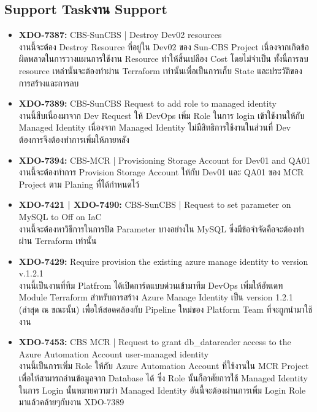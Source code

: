\subsection{\ifenglish Support Task\else งาน Support\fi}
\begin{itemize}
      \item \textbf{XDO-7387:} CBS-SunCBS | Destroy Dev02 resources \\
            งานนี้จะต้อง Destroy Resource ที่อยู่ใน Dev02 ของ Sun-CBS Project เนื่องจากเกิดข้อผิดพลาดในการวางแผนการใช้งาน Resource ทำให้สิ้นเปลือง Cost โดยไม่จำเป็น ทั้งนี้การลบ resource เหล่านั้นจะต้องทำผ่าน Terraform เท่านั้นเพื่อเป็นการเก็บ State และประวัติของการสร้างและการลบ
      \item \textbf{XDO-7389:} CBS-SunCBS Request to add role to managed identity \\
            งานนี้สืบเนื่องมาจาก Dev Request ให้ DevOps เพิ่ม Role ในการ login เข้าใช้งานให้กับ Managed Identity เนื่องจาก Managed Identity ไม่มีสิทธิการใช้งานในส่วนที่ Dev ต้องการจึงต้องทำการเพิ่มให้ภายหลัง
      \item \textbf{XDO-7394:} CBS-MCR | Provisioning Storage Account for Dev01 and QA01 \\
            งานนี้จะต้องทำการ Provision Storage Account ให้กับ Dev01 และ QA01 ของ MCR Project ตาม Planing ที่ได้กำหนดไว้
      \item \textbf{XDO-7421 | XDO-7490:} CBS-SunCBS | Request to set parameter on MySQL to Off on IaC\\
            งานนี้จะต้องหาวิธีการในการปิด Parameter บางอย่างใน MySQL ซึ่งมีข้อจำจัดคือจะต้องทำผ่าน Terraform เท่านั้น
      \item \textbf{XDO-7429:} Require provision the existing azure manage identity to version v.1.2.1\\
            งานนี้เป็นงานที่ทีม Platfrom ได้เปิดการ์ดแบบด่วนเข้ามาทีม DevOps เพิ่มให้อัพเดท Module Terraform สำหรับการสร้าง Azure Manage Identity เป็น version 1.2.1 (ล่าสุด ณ ขณะนั้น) เพื่อให้สอดคล้องกับ Pipeline ใหม่ของ Platform Team ที่จะถูกนำมาใช้งาน
      \item \textbf{XDO-7453:} CBS MCR | Request to grant db\_datareader access to the Azure Automation Account user-managed identity\\
            งานนี้เป็นการเพิ่ม Role ให้กับ Azure Automation Account ที่ใช้งานใน MCR Project เพื่อให้สามารถอ่านข้อมูลจาก Database ได้ ซึ่ง Role นั้นก็อาศัยการใช้ Managed Identity ในการ Login นั้นหมายความว่า Managed Identity อันนี้จะต้องผ่านการเพิ่ม Login Role มาแล้วคล้ายๆกับงาน XDO-7389

\end{itemize}

